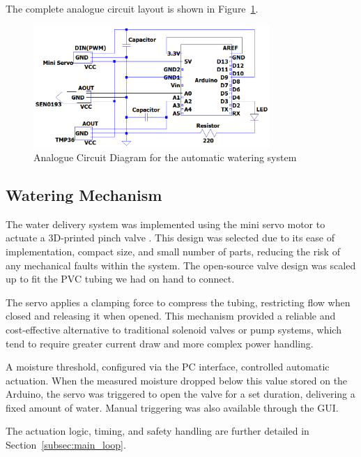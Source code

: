 \documentclass[a4paper,11pt]{article}
\begin{document}
The complete analogue circuit layout is shown in 
Figure~\ref{fig:Analogue_Circuit_Diagram_for_the_automatic_watering_system}.

\begin{figure}[H]
    \centering
    \includegraphics[width=0.8\textwidth]{Analogue Circuit Diagram - final.png}
    \caption{Analogue Circuit Diagram for the automatic watering system}
    \label{fig:Analogue_Circuit_Diagram_for_the_automatic_watering_system}
\end{figure}

\subsection{Watering Mechanism}
\label{sec:water_system}

The water delivery system was implemented using the mini servo motor to actuate a 
3D-printed pinch valve \cite{pinch_valve_design}. 
This design was selected due to its ease of implementation, compact size, 
and small number of parts,
reducing the risk of any mechanical faults within the system. 
The open-source valve design was scaled up 
to fit the PVC tubing we had on hand to connect.

The servo applies a clamping force to compress the tubing, restricting flow when closed 
and releasing it when opened. This mechanism provided a reliable and cost-effective 
alternative to traditional solenoid valves or pump systems, which tend to require 
greater current draw and more complex power handling.

A moisture threshold, configured via the PC interface, controlled automatic actuation. 
When the measured moisture dropped below this value stored on the Arduino, 
the servo was triggered to open the valve for a set duration, 
delivering a fixed amount of water. 
Manual triggering was also available through the GUI.

The actuation logic, timing, and safety handling are further detailed in 
Section~\ref{subsec:main_loop}.
\end{document}
